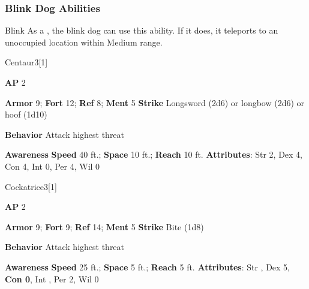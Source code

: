 \subsubsection{Blink Dog Abilities}

\begin{freeability}{Blink}
As a , the blink dog can use this ability.
If it does, it teleports to an unoccupied location within Medium range.
\end{freeability}

\begin{monsection}{Centaur}{3}[1]
\vspace{-1em}\vspace{-1em}
\begin{spellcontent}
\begin{spelltargetinginfo}
{\textbf{AP} 2}

\pari \textbf{Armor} 9;
\textbf{Fort} 12;
\textbf{Ref} 8;
\textbf{Ment} 5
\pari \textbf{Strike} Longsword  (2d6) or longbow  (2d6) or hoof  (1d10)



\pari \textbf{Behavior} Attack highest threat
\end{spelltargetinginfo}
\end{spellcontent}

\begin{monsterfooter}
\pari \textbf{Awareness} 
\pari \textbf{Speed} 40 ft.;
\textbf{Space} 10 ft.;
\textbf{Reach} 10 ft.
\pari \textbf{Attributes}:
Str 2,
Dex 4,
Con 4,
Int 0,
Per 4,
Wil 0
\end{monsterfooter}
\end{monsection}

\begin{monsection}{Cockatrice}{3}[1]
\vspace{-1em}\vspace{-1em}
\begin{spellcontent}
\begin{spelltargetinginfo}
{\textbf{AP} 2}

\pari \textbf{Armor} 9;
\textbf{Fort} 9;
\textbf{Ref} 14;
\textbf{Ment} 5
\pari \textbf{Strike} Bite  (1d8)



\pari \textbf{Behavior} Attack highest threat
\end{spelltargetinginfo}
\end{spellcontent}

\begin{monsterfooter}
\pari \textbf{Awareness} 
\pari \textbf{Speed} 25 ft.;
\textbf{Space} 5 ft.;
\textbf{Reach} 5 ft.
\pari \textbf{Attributes}:
Str ,
Dex 5,
\textbf{Con 0},
Int ,
Per 2,
Wil 0
\end{monsterfooter}
\end{monsection}


